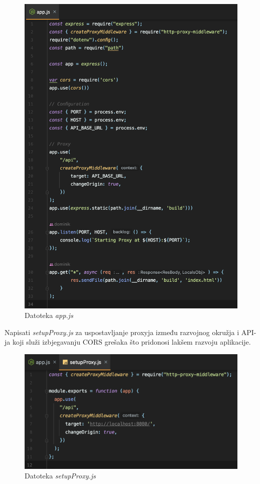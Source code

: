 \begin{enumerate}
			\begin{figure}[H]
				\includegraphics[scale=0.4]{slike/deploy/frontend5.png} %
				\centering
				\caption{Datoteka \textit{app.js}}
				\label{fig:promjene}
			\end{figure}
			
			Napisati \textit{setupProxy.js} za uspostavljanje proxyja između razvojnog okružja i API-ja koji služi izbjegavanju CORS grešaka što pridonosi lakšem razvoju aplikacije.
			\begin{figure}[H]
				\includegraphics[scale=0.4]{slike/deploy/frontend6.png} %
				\centering
				\caption{Datoteka \textit{setupProxy.js}}
				\label{fig:promjene}
			\end{figure}
			

\end{enumerate}
